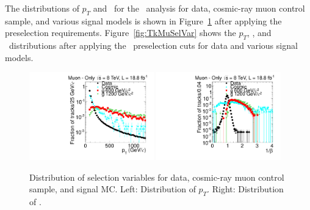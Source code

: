 The distributions of $p_T$ and \invbeta\ for the \muononly\ analysis for data, cosmic-ray muon control sample, and various signal models is 
shown in Figure~\ref{fig:MuOnlySelVar} after applying the preselection requirements. Figure~\ref{fig:TkMuSelVar} shows the $p_T$, \invbeta, and \dedx\
distributions after applying the \tktof\ preselection cuts for data and various signal models.

\begin{figure}
\centering
  \includegraphics[clip=false, trim=0.0cm 0cm 0.0cm 0cm, width=0.48\textwidth]{figures/muonly/Selection_Comp_8TeV_Cosmic_Pt_BS}
  \includegraphics[clip=false, trim=0.0cm 0cm 0.0cm 0cm, width=0.48\textwidth]{figures/muonly/Selection_Comp_8TeV_Cosmic_TOF_BS} \\
  \caption[Distribution of \invbeta\ and \pt\ in the \muononly\ analysis for data, cosmic-ray muon control sample, and signal MC]
{Distribution of selection variables for data, cosmic-ray muon control sample, and signal MC.
Left: Distribution of $p_T$. Right: Distribution of \invbeta.}
    \label{fig:MuOnlySelVar}
\end{figure}

